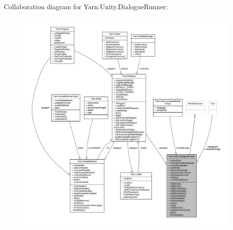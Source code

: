 Collaboration diagram for Yarn.\-Unity.\-Dialogue\-Runner\-:
\nopagebreak
\begin{figure}[H]
\begin{center}
\leavevmode
\includegraphics[width=350pt]{a00784}
\end{center}
\end{figure}
